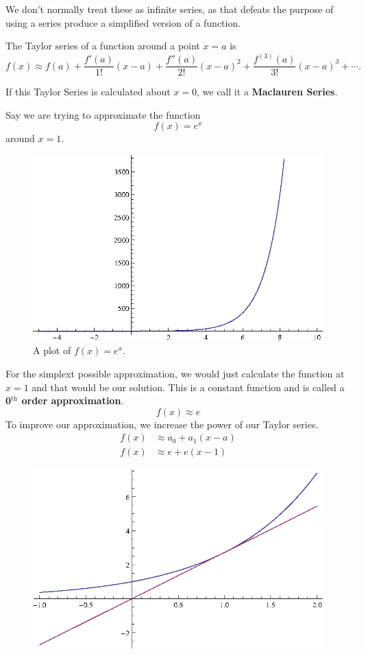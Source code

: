 We don't normally treat these as infinite series, as that defeats the purpose of using a series produce a simplified version of a function.

\begin{theorem}
  The Taylor series of a function around a point $x=a$ is
  \[ f(x) \approx f(a) + \frac{f'(a)}{1!}(x-a) + \frac{f''(a)}{2!}(x-a)^2+\frac{f^{(3)}(a)}{3!}(x-a)^3+\cdots . \]
  \label{th:taylorseries}
\end{theorem}
If this Taylor Series is calculated about $x=0$, we call it a \textbf{Maclauren Series}.
\begin{ex}
   Say we are trying to approximate the function
  \[ f(x) =  e^x \]
  around $x=1$.
  \begin{figure}[H]
    \begin{center}
      \includegraphics{continuous/series/etx}
    \end{center}
    \caption{A plot of $f(x)=e^x$.}
  \end{figure}
  For the simplext possible approximation, we would just calculate the function at $x=1$ and that would be our solution.
  This is a constant function and is called a \textbf{0$^\textrm{th}$ order approximation}.
  \[f(x) \approx e \]
  To improve our approximation, we increase the power of our Taylor series.
  \begin{align*}
    f(x) &\approx a_0 + a_1 (x-a)\\
    f(x) &\approx e + e (x-1)
  \end{align*}
  \begin{figure}[H]
    \begin{center}
      \includegraphics{continuous/series/1storder}

\end{center}
\end{figure}
\end{ex}
